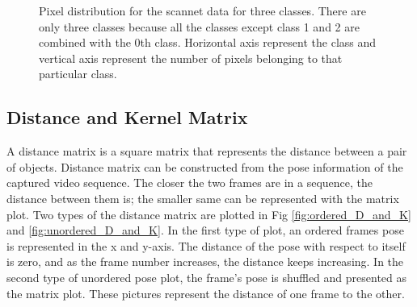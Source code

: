    	\begin{figure}%
    	\centering
    	\qquad
    	\caption{Pixel distribution for the scannet data for three classes. There are only three classes because all the classes except class 1 and 2 are combined with the 0th class. Horizontal axis represent the class and vertical axis represent the number of pixels belonging to that particular class.}%
    	\label{fig:scannet_three_classes}%
    \end{figure}
    \subsection{Distance and Kernel Matrix}
	
	A distance matrix is a square matrix that represents the distance between a pair of objects. Distance matrix can be constructed from the pose information of the captured video sequence. The closer the two frames are in a sequence, the distance between them is; the smaller same can be represented with the matrix plot. Two types of the distance matrix are plotted in Fig \ref{fig:ordered_D_and_K} and \ref{fig:unordered_D_and_K}. In the first type of plot, an ordered frames pose is represented in the x and y-axis. The distance of the pose with respect to itself is zero, and as the frame number increases, the distance keeps increasing. In the second type of unordered pose plot, the frame's pose is shuffled and presented as the matrix plot. These pictures represent the distance of one frame to the other. 
	
